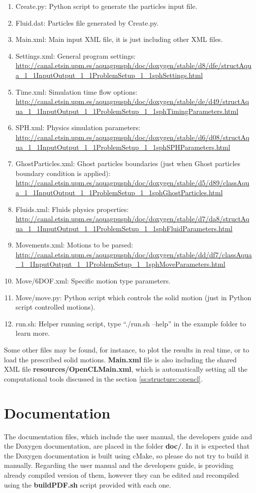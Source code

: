 \begin{enumerate}
	\item Create.py: Python script to generate the particles input file.
	\item Fluid.dat: Particles file generated by Create.py.
	\item Main.xml: Main input XML file, it is just including other XML files.
	\item Settings.xml: General program settings:
	\url{http://canal.etsin.upm.es/aquagpusph/doc/doxygen/stable/d8/dfe/structAqua_1_1InputOutput_1_1ProblemSetup_1_1sphSettings.html}
	\item Time.xml: Simulation time flow options:
	\url{http://canal.etsin.upm.es/aquagpusph/doc/doxygen/stable/de/d49/structAqua_1_1InputOutput_1_1ProblemSetup_1_1sphTimingParameters.html}
	\item SPH.xml: Physics simulation parameters:
	\url{http://canal.etsin.upm.es/aquagpusph/doc/doxygen/stable/d6/d08/structAqua_1_1InputOutput_1_1ProblemSetup_1_1sphSPHParameters.html}
	\item GhostParticles.xml: Ghost particles boundaries (just when Ghost particles boundary condition is applied):
	\url{http://canal.etsin.upm.es/aquagpusph/doc/doxygen/stable/d5/d89/classAqua_1_1InputOutput_1_1ProblemSetup_1_1sphGhostParticles.html}
	\item Fluids.xml: Fluids physics properties:
	\url{http://canal.etsin.upm.es/aquagpusph/doc/doxygen/stable/d7/da8/structAqua_1_1InputOutput_1_1ProblemSetup_1_1sphFluidParameters.html}
	\item Movements.xml: Motions to be parsed:
	\url{http://canal.etsin.upm.es/aquagpusph/doc/doxygen/stable/dd/df7/classAqua_1_1InputOutput_1_1ProblemSetup_1_1sphMoveParameters.html}
	\item Move/6DOF.xml: Specific motion type parameters.
	\item Move/move.py: Python script which controls the solid motion (just in Python script controlled motions).
	\item run.sh: Helper running script, type ``./run.sh --help'' in the example folder to learn more.
\end{enumerate}
%
Some other files may be found, for instance, to plot the results in real time, or to load the prescribed solid motions.\rc
%
\textbf{Main.xml} file is also including the shared XML file \textbf{resources/OpenCLMain.xml}, which is automatically setting all the computational tools discussed in the section \ref{ss:structure::opencl}.
%
\section{Documentation}
\label{ss:structure::doc}
%
The documentation files, which include the user manual, the developers guide and the Doxygen documentation, are placed in the folder \textbf{doc/}.\rc
%
In \NAME it is expected that the Doxygen documentation is built using cMake, so please do not try to build it manually.\rc
%
Regarding the user manual and the developers guide, \NAME is providing already compiled version of them, however they can be edited and recompiled using the \textbf{buildPDF.sh} script provided with each one.
%
